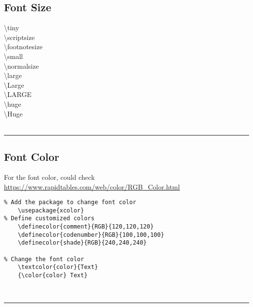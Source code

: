 \documentclass[a4paper,12pt,titlepage]{article}
\begin{document}
\subsection{Font Size}
\hspace*{4mm}\textbackslash tiny			
\\\hspace*{4mm}\textbackslash scriptsize		
\\\hspace*{4mm}\textbackslash footnotesize	
\\\hspace*{4mm}\textbackslash small			
\\\hspace*{4mm}\textbackslash normalsize	
\\\hspace*{4mm}\textbackslash large			
\\\hspace*{4mm}\textbackslash Large		
\\\hspace*{4mm}\textbackslash LARGE		
\\\hspace*{4mm}\textbackslash huge			
\\\hspace*{4mm}\textbackslash Huge			
\\
\\
\rule{\linewidth}{0.1mm}




\subsection{Font Color}
For the font color, could check \url{https://www.rapidtables.com/web/color/RGB_Color.html}
\\
\begin{lstlisting}
% Add the package to change font color
	\usepackage{xcolor}
% Define customized colors
	\definecolor{comment}{RGB}{120,120,120}
	\definecolor{codenumber}{RGB}{100,100,100}
	\definecolor{shade}{RGB}{240,240,240}

% Change the font color
	\textcolor{color}{Text}
	{\color{color} Text}

\end{lstlisting}
~\\
\rule{\linewidth}{0.1mm}
\end{document}
